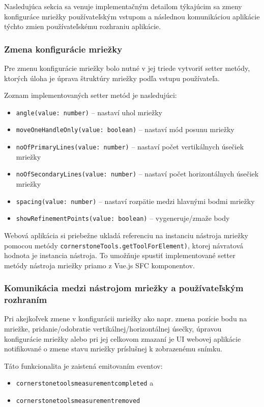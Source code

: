 Nasledujúca sekcia sa venuje implementačným detailom týkajúcim sa zmeny konfiguráce mriežky používateľským vstupom a následnou komunikáciou aplikácie týchto zmien používateľskému rozhraniu aplikácie.

\subsubsection {Zmena konfigurácie mriežky}
Pre zmenu konfigurácie mriežky bolo nutné v jej triede vytvoriť setter metódy, ktorých úloha je úprava štruktúry mriežky podľa vstupu používateľa.

Zoznam implementovaných setter metód je nasledujúci:
\begin {itemize}
\item {\texttt{angle(value: number)} -- nastaví uhol mriežky}
\item {\texttt{moveOneHandleOnly(value: boolean)} -- nastaví mód posunu mriežky}
\item {\texttt{noOfPrimaryLines(value: number)} -- nastaví počet vertikálnych úsečiek mriežky}
\item {\texttt{noOfSecondaryLines(value: number)} -- nastaví počet horizontálnych úsečiek mriežky}
\item {\texttt{spacing(value: number)} -- nastaví rozpätie medzi hlavnými bodmi mriežky}
\item {\texttt{showRefinementPoints(value: boolean)} -- vygeneruje/zmaže  body}
\end {itemize}

\clearpage

Webová aplikácia si priebežne ukladá referenciu na instanciu nástroja mriežky pomocou metódy \texttt{cornerstoneTools.getToolForElement)}, ktorej návratová hodnota je instancia nástroja. To umožňuje spustiť implementované setter metódy nástroja mriežky priamo z Vue.js SFC komponentov.

\subsubsection {Komunikácia medzi nástrojom mriežky a používateľským rozhraním}
Pri akejkoľvek zmene v konfigurácii mriežky ako napr. zmena pozície bodu na mriežke, pridanie/odobratie vertikálnej/horizontálnej úsečky, úpravou konfigurácie mriežky alebo pri jej celkovom zmazaní je UI webovej aplikácie notifikované o zmene stavu mriežky príslušnej k zobrazenému snímku.

Táto funkcionalita je zaistená emitovaním eventov:
\begin {itemize}
\item {\texttt{cornerstonetoolsmeasurementcompleted} a}
\item {\texttt{cornerstonetoolsmeasurementremoved}}
\end {itemize}

